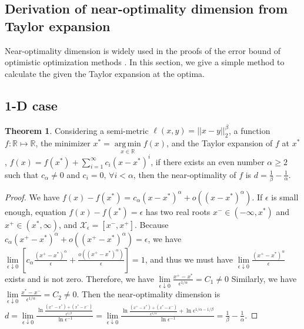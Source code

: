 \documentclass[11pt]{article}
\DeclareMathOperator*{\argmin}{arg\,min}
\theoremstyle{definition}
\newtheorem{thm}{Theorem}
\begin{document}



\begin{appendices}

\section{Derivation of near-optimality dimension from Taylor expansion}
Near-optimality dimension is widely used in the proofs of the error bound of optimistic optimization methods \cite{munos2014bandits}. In this section, we give a simple method to calculate the  given the Taylor expansion at the optima.

\subsection{1-D case}
\begin{thm}
Considering a semi-metric $\ell(x, y) = ||x - y||_2^\beta$, a function $f: \mathbb{R} \mapsto \mathbb{R}$, the minimizer $x^* = \argmin\limits_{x \in \mathbb{R}} f(x)$, and the Taylor expansion of $f$ at $x^*$, $f(x) = f(x^*) + \sum\limits_{i = 1}^{\infty} c_i (x - x^*)^i$, if there exists an even number $\alpha \geq 2$ such that $c_\alpha \neq 0$ and $c_i = 0,\,\forall i<\alpha$, then the near-optimality of $f$ is $d = \frac{1}{\beta} - \frac{1}{\alpha}$.
\end{thm}

\begin{proof}
We have $f(x) - f(x^*) = c_\alpha (x-x^*)^\alpha + o((x-x^*)^\alpha)$. If $\epsilon$ is small enough, equation $f(x) - f(x^*) = \epsilon$ has two real roots $x^- \in (-\infty, x^*)$ and $x^+ \in (x^*, \infty)$, and $\mathcal{X}_\epsilon = [x^-, x^+]$. Because $c_\alpha (x^+-x^*)^\alpha + o((x^+-x^*)^\alpha) = \epsilon$, we have $\lim\limits_{\epsilon \downarrow 0} \left[ c_\alpha \frac{(x^+-x^*)^\alpha}{\epsilon} + \frac{o((x^+-x^*)^\alpha)}{\epsilon} \right] = 1$, and thus we must have $\lim\limits_{\epsilon \downarrow 0} \frac{(x^+-x^*)^\alpha}{\epsilon}$ exists and is not zero. Therefore, we have $\lim\limits_{\epsilon \downarrow 0} \frac{x^+ - x^*}{\epsilon^{1/\alpha}} = C_1 \neq 0$  Similarly, we have $\lim\limits_{\epsilon \downarrow 0} \frac{x^* - x^-}{\epsilon^{1/\alpha}} = C_2 \neq 0$. Then the near-optimality dimension is $d = \lim\limits_{\epsilon \downarrow 0} \frac{\ln \frac{(x^+ - x^*) + (x ^* - x^-)}{\epsilon^{1/\beta}}}{\ln \epsilon^{-1}} = \lim\limits_{\epsilon \downarrow 0} \frac{\ln \frac{(x^+ - x^*) + (x ^* - x^-)}{\epsilon^{1/\alpha}} + \ln \epsilon^{1/\alpha - 1/\beta}}{\ln \epsilon^{-1}} = \frac{1}{\beta} - \frac{1}{\alpha}.$
\end{proof}


\end{appendices}
\end{document}
